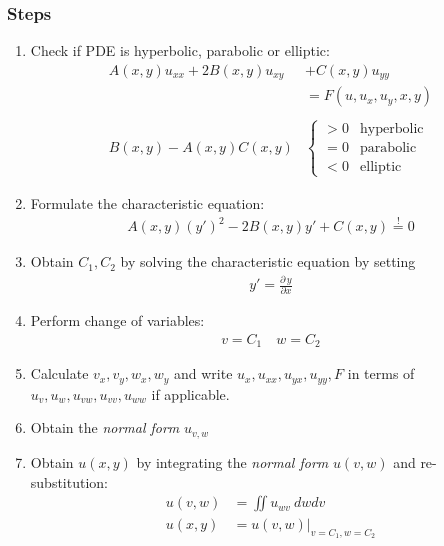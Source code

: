 \subsubsection{Steps}
\begin{enumerate}
    \item Check if PDE is hyperbolic, parabolic or elliptic:
          \begin{align*}
              A(x,y)u_{xx}+2B(x,y)u_{xy} & +C(x,y)u_{yy}          \\
                                         & =F(u,u_x,u_y,x,y)      \\\\
              B(x,y)-A(x,y)C(x,y)        & \begin{cases}
                                               >0 & \text{hyperbolic} \\
                                               =0 & \text{parabolic}  \\
                                               <0 & \text{elliptic}
                                           \end{cases}
          \end{align*}
    \item Formulate the characteristic equation:
          \begin{align*}
              A(x,y){(y')}^2-2B(x,y)y'+C(x,y)\overset{!}{=} 0
          \end{align*}
    \item Obtain $C_{1},C_{2}$ by solving the characteristic equation by setting
          \begin{align*}
              y'=\frac{\partial\, y}{\partial x}
          \end{align*}
    \item Perform change of variables:
          \begin{align*}
              v = C_{1} \quad w=C_{2}
          \end{align*}
    \item Calculate $v_{x},v_{y},w_{x},w_{y}$
          and write $u_{x},u_{xx},u_{yx},u_{yy},F$ in terms of
          $u_{v},u_{w},u_{vw},u_{vv},u_{ww}$ if applicable.
    \item Obtain the \textit{normal form} $u_{v,w}$
    \item Obtain $u(x,y)$ by integrating the \textit{normal form} $u(v,w)$
          and re-substitution:
          \begin{align*}
              u(v,w) & =\iint u_{wv}\ dwdv         \\
              u(x,y) & =u(v,w)|_{v=C_{1}, w=C_{2}}
          \end{align*}
\end{enumerate}

